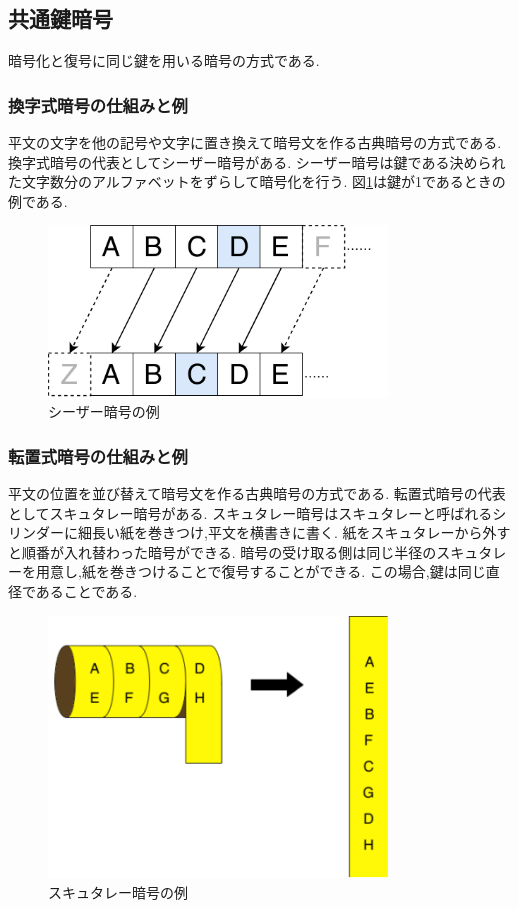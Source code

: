 \documentclass[a4j,12pt]{jsarticle}
\begin{document}
\subsection{共通鍵暗号}
暗号化と復号に同じ鍵を用いる暗号の方式である.


\subsubsection{換字式暗号の仕組みと例}
平文の文字を他の記号や文字に置き換えて暗号文を作る古典暗号の方式である.
換字式暗号の代表としてシーザー暗号がある.
シーザー暗号は鍵である決められた文字数分のアルファベットをずらして暗号化を行う.
図\ref{fig:05}は鍵が1であるときの例である.

\begin{figure}[H]
\centering
\includegraphics[width=9cm]{05.pdf}
\caption{シーザー暗号の例}
\label{fig:05}
\end{figure} 


\subsubsection{転置式暗号の仕組みと例}
平文の位置を並び替えて暗号文を作る古典暗号の方式である.
転置式暗号の代表としてスキュタレー暗号がある.
スキュタレー暗号はスキュタレーと呼ばれるシリンダーに細長い紙を巻きつけ,平文を横書きに書く.
紙をスキュタレーから外すと順番が入れ替わった暗号ができる.
暗号の受け取る側は同じ半径のスキュタレーを用意し,紙を巻きつけることで復号することができる.
この場合,鍵は同じ直径であることである.

\begin{figure}[H]
\centering
\includegraphics[width=9cm]{062.pdf}
\caption{スキュタレー暗号の例}
\label{fig:06}
\end{figure} 
\end{document}
